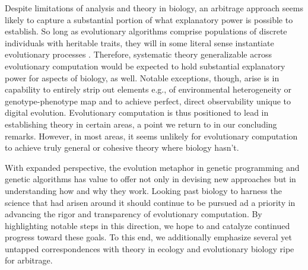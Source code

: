 Despite limitations of analysis and theory in biology, an arbitrage approach seems likely to capture a substantial portion of what explanatory power is possible to establish.
So long as evolutionary algorithms comprise populations of discrete individuals with heritable traits, they will in some literal sense instantiate evolutionary processes \citep{pennock2007models}.
Therefore, systematic theory generalizable across evolutionary computation would be expected to hold substantial explanatory power for aspects of biology, as well.
Notable exceptions, though, arise is in capability to entirely strip out elements e.g., of environmental heterogeneity or genotype-phenotype map and to achieve perfect, direct observability unique to digital evolution.
Evolutionary computation is thus positioned to lead in establishing theory in certain areas, a point we return to in our concluding remarks.
However, in most areas, it seems unlikely for evolutionary computation to achieve truly general or cohesive theory where biology hasn't.

With expanded perspective, the evolution metaphor in genetic programming and genetic algorithms has value to offer not only in devising new approaches but in understanding how and why they work.
Looking past biology to harness the science that had arisen around it should continue to be pursued ad a priority in advancing the rigor and transparency of evolutionary computation.
By highlighting notable steps in this direction, we hope to and catalyze continued progress toward these goals.
To this end, we additionally emphasize several yet untapped correspondences with theory in ecology and evolutionary biology ripe for arbitrage.
